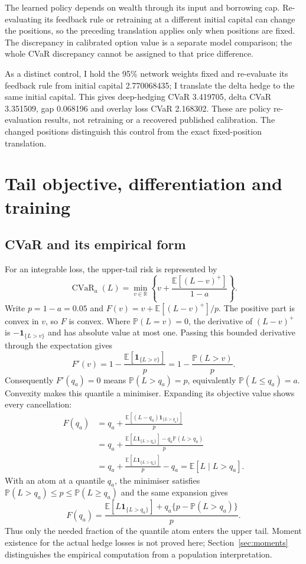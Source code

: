 \documentclass[11pt,a4paper]{article}
\newcommand{\E}{\mathbb E}
\newcommand{\Pp}{\mathbb P}
\newcommand{\ind}{\mathbf 1}
\newcommand{\CVaR}{\operatorname{CVaR}}
\theoremstyle{remark}
\begin{document}
The learned policy depends on wealth through its input and borrowing cap. Re-evaluating its feedback rule or retraining at a different initial capital can change the positions, so the preceding translation applies only when positions are fixed. The discrepancy in calibrated option value is a separate model comparison; the whole CVaR discrepancy cannot be assigned to that price difference.

As a distinct control, I hold the 95\% network weights fixed and re-evaluate its feedback rule from initial capital 2.770068435; I translate the delta hedge to the same initial capital. This gives deep-hedging CVaR 3.419705, delta CVaR 3.351509, gap 0.068196 and overlay loss CVaR 2.168302. These are policy re-evaluation results, not retraining or a recovered published calibration. The changed positions distinguish this control from the exact fixed-position translation.

\section{Tail objective, differentiation and training}
\subsection{CVaR and its empirical form}
For an integrable loss, the upper-tail risk is represented by
\begin{equation}
 \CVaR_a(L)=\min_{v\in\mathbb R}
       \left\{v+\frac{\E[(L-v)^+]}{1-a}\right\}.
 \label{eq:cvar}
\end{equation}
Write $p=1-a=0.05$ and $F(v)=v+\E[(L-v)^+]/p$. The positive part is convex in $v$, so $F$ is convex. Where $\Pp(L=v)=0$, the derivative of $(L-v)^+$ is $-\ind_{\{L>v\}}$ and has absolute value at most one. Passing this bounded derivative through the expectation gives
\begin{equation}
 F'(v)=1-\frac{\E[\ind_{\{L>v\}}]}p
      =1-\frac{\Pp(L>v)}p.
\end{equation}
Consequently $F'(q_a)=0$ means $\Pp(L>q_a)=p$, equivalently $\Pp(L\leq q_a)=a$. Convexity makes this quantile a minimiser. Expanding its objective value shows every cancellation:
\begin{align}
 F(q_a)
 &=q_a+\frac{\E[(L-q_a)\ind_{\{L>q_a\}}]}p\nonumber\\
 &=q_a+\frac{\E[L\ind_{\{L>q_a\}}]-q_a\Pp(L>q_a)}p\nonumber\\
 &=q_a+\frac{\E[L\ind_{\{L>q_a\}}]}p-q_a
 =\E[L\mid L>q_a].
\end{align}
With an atom at a quantile $q_a$, the minimiser satisfies
$\Pp(L>q_a)\leq p\leq\Pp(L\geq q_a)$ and the same expansion gives
\begin{equation}
 F(q_a)=\frac{\E[L\ind_{\{L>q_a\}}]
       +q_a\{p-\Pp(L>q_a)\}}p.
\end{equation}
Thus only the needed fraction of the quantile atom enters the upper tail. Moment existence for the actual hedge losses is not proved here; Section~\ref{sec:moments} distinguishes the empirical computation from a population interpretation.
\end{document}
